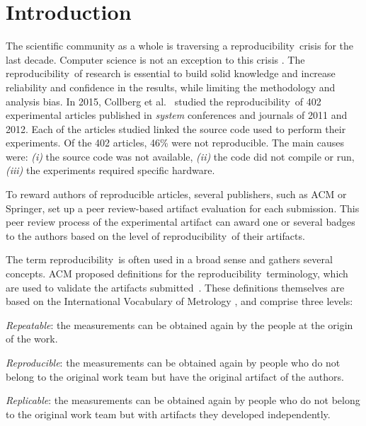 \documentclass[sigconf,natbib=false]{acmart}
\newcommand{\repro}{reproducibility}
\begin{document}

\section{Introduction}

The scientific community as a whole is traversing a \repro\ crisis for the last decade.
Computer science is not an exception to this crisis \cite{randallIrreproducibilityCrisisModern2018,baker500ScientistsLift2016}.
The \repro\ of research is essential to build solid knowledge and increase reliability and confidence in the results, while limiting the methodology and analysis bias.
In 2015, Collberg et al.\ \cite{collberg_repeatability_2015} studied the \repro\ of 402 experimental articles published in \emph{system} conferences and journals of 2011 and 2012.
Each of the articles studied linked the source code used to perform their experiments. 
Of the 402 articles, 46\% were not reproducible.
The main causes were:
\emph{(i)} the source code was not available,
\emph{(ii)} the code did not compile or run,
\emph{(iii)} the experiments required specific hardware.

To reward authors of reproducible articles, several publishers, such as ACM or Springer, set up a peer review-based artifact evaluation for each submission.
This peer review process of the experimental artifact can award one or several badges to the authors based on the level of \repro\ of their artifacts.

The term \repro\ is often used in a broad sense and gathers several concepts.
ACM proposed definitions for the \repro\ terminology, which are used to validate the artifacts submitted~\cite{acm-badges}.
These definitions themselves are based on the International Vocabulary of Metrology \cite{defs_vim}, and comprise three levels:
\begin{enumerate*}[label=(\roman*)]
  \item \emph{Repeatable}: the measurements can be obtained again by the people at the origin of the work.
\item \emph{Reproducible}: the measurements can be obtained again by people who do not belong to the original work team but have the original artifact of the authors.
\item \emph{Replicable}: the measurements can be obtained again by people who do not belong to the original work team but with artifacts they developed independently.
\end{enumerate*}
\end{document}
